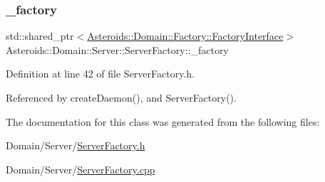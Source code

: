 \subsubsection{\texorpdfstring{\+\_\+factory}{\_factory}}
{\footnotesize\ttfamily std\+::shared\+\_\+ptr$<$\hyperlink{classAsteroids_1_1Domain_1_1Factory_1_1FactoryInterface}{Asteroids\+::\+Domain\+::\+Factory\+::\+Factory\+Interface}$>$ Asteroids\+::\+Domain\+::\+Server\+::\+Server\+Factory\+::\+\_\+factory\hspace{0.3cm}{\ttfamily [private]}}



Definition at line 42 of file Server\+Factory.\+h.



Referenced by create\+Daemon(), and Server\+Factory().



The documentation for this class was generated from the following files\+:\begin{DoxyCompactItemize}
\item 
Domain/\+Server/\hyperlink{ServerFactory_8h}{Server\+Factory.\+h}\item 
Domain/\+Server/\hyperlink{ServerFactory_8cpp}{Server\+Factory.\+cpp}\end{DoxyCompactItemize}
